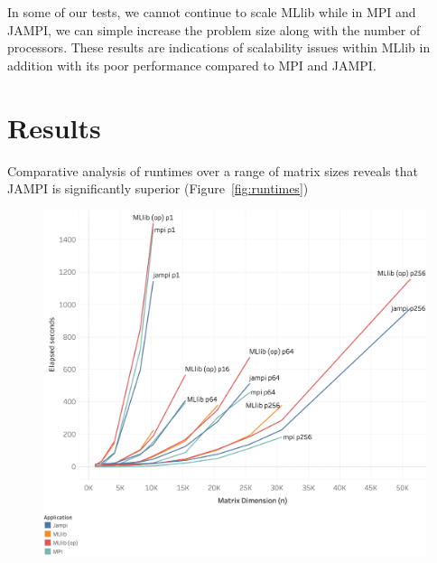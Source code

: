 \documentclass[fleqn,10pt]{SelfArx} %
\begin{document}
In some of our tests, we cannot continue to scale MLlib while in MPI and JAMPI, we can simple increase the problem size along with the number of processors. These results are indications of scalability issues within MLlib in addition with its poor performance compared to MPI and JAMPI.







\section{Results} %
\label{sec:results}

Comparative analysis of runtimes over a range of matrix sizes reveals that JAMPI is significantly superior (Figure~\ref{fig:runtimes})

\begin{figure}
	\centering
	\includegraphics[width=\linewidth]{overall_performance}
\end{figure}
\end{document}
